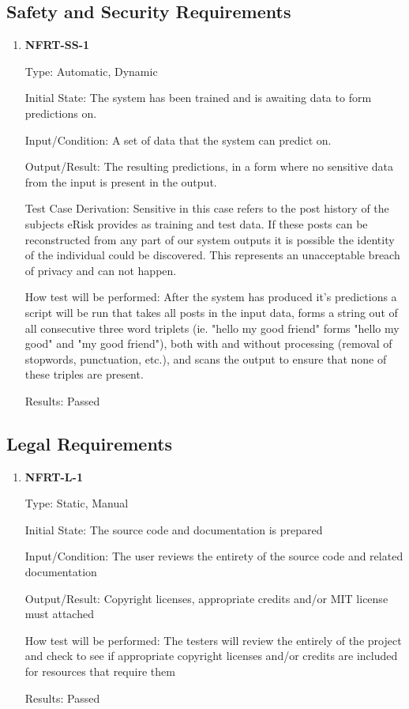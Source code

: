 \documentclass[12pt, titlepage]{article}
\begin{document}
\subsection{Safety and Security Requirements}

\begin{enumerate}

\item \textbf{NFRT-SS-1}
	
Type: Automatic, Dynamic
						
Initial State: The system has been trained and is awaiting data to form predictions on.
						
Input/Condition: A set of data that the system can predict on.
						
Output/Result: The resulting predictions, in a form where no sensitive data from the input is present in the output.
	
Test Case Derivation: Sensitive in this case refers to the post history of the subjects eRisk provides as training and test data. If these posts can be reconstructed from any part of our system outputs it is possible the identity of the individual could be discovered. This represents an unacceptable breach of privacy and can not happen.
						
How test will be performed: After the system has produced it's predictions a script will be run that takes all posts in the input data, forms a string out of all consecutive three word triplets (ie. "hello my good friend" forms "hello my good" and "my good friend"), both with and without processing (removal of stopwords, punctuation, etc.), and scans the output to ensure that none of these triples are present.

Results: Passed
	
\end{enumerate}

\subsection{Legal Requirements}

\begin{enumerate}

\item \textbf{NFRT-L-1}

Type: Static, Manual
					
Initial State: The source code and documentation is prepared
					
Input/Condition: The user reviews the entirety of the source code and related documentation
					
Output/Result: Copyright licenses, appropriate credits and/or MIT license must attached
					
How test will be performed: The testers will review the entirely of the project and check to see if appropriate copyright licenses and/or credits are included for resources that require them

Results: Passed

\end{enumerate}
\end{document}
